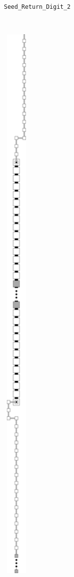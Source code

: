 \begin{figure}[H]
\begin{subfigure}[t]{0.25\textwidth}
        \caption{\label{fig:seed_return_digit_2} {\tt Seed\_Return\_Digit\_2}}
    \end{subfigure}%
    ~
    \begin{subfigure}[t]{0.25\textwidth}
        \centering
        \includegraphics[width=0.15\textwidth]{seed/seed_return_digit_3}

\end{subfigure}
\end{figure}
